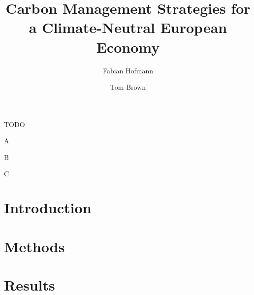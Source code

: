 \documentclass[5p]{elsarticle}
\begin{document}
\begin{frontmatter}

	\title{Carbon Management Strategies for a Climate-Neutral European Economy}

	\author[tub]{Fabian Hofmann}
	\author[tub]{Tom Brown}


	\address[affil]{ Department of Digital Transformation in Energy Systems, Institute of Energy Technology, Technische Universität Berlin, Fakultät III, Einsteinufer 25 (TA 8), 10587 Berlin, Germany }

	\begin{abstract}
		
	\end{abstract}

	\begin{keyword}
		TODO
	\end{keyword}


	\begin{highlights}
		\item A
		\item B
		\item C
	\end{highlights}

\end{frontmatter}



\section{Introduction}
\label{sec:introduction}



\section{Methods}
\label{sec:methods}



\section{Results}
\label{sec:results}


\end{document}
